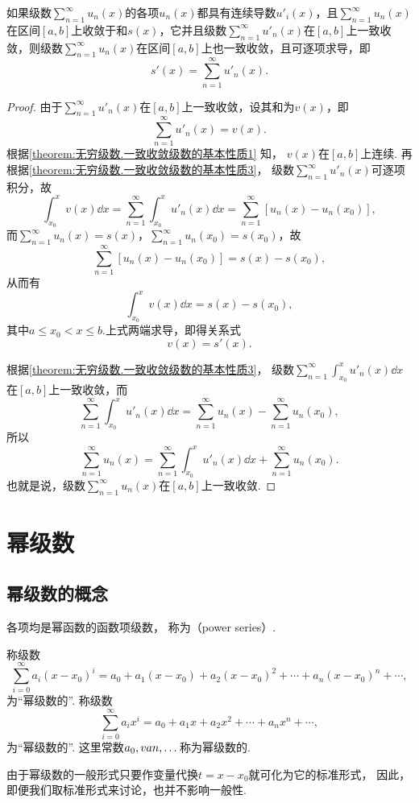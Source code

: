 \begin{property}\label{theorem:无穷级数.一致收敛级数的基本性质4}
\def\s{\sum\limits_{n=1}^\infty }
如果级数\(\s u_n(x)\)的各项\(u_n(x)\)都具有连续导数\(u'_i(x)\)，且\(\s u_n(x)\)在区间\([a,b]\)上收敛于和\(s(x)\)，它并且级数\(\s u'_n(x)\)在\([a,b]\)上一致收敛，则级数\(\s u_n(x)\)在区间\([a,b]\)上也一致收敛，且可逐项求导，即\[
s'(x) = \s u'_n(x).
\]
\begin{proof}
由于\(\s u'_n(x)\)在\([a,b]\)上一致收敛，设其和为\(v(x)\)，即\[
\s u'_n(x) = v(x).
\]
根据\cref{theorem:无穷级数.一致收敛级数的基本性质1} 知，%
\(v(x)\)在\([a,b]\)上连续.
再根据\cref{theorem:无穷级数.一致收敛级数的基本性质3}，%
级数\(\s u'_n(x)\)可逐项积分，故\[
\int_{x_0}^x v(x) \dd{x}
= \s \int_{x_0}^x u'_n(x) \dd{x}
= \s [u_n(x) - u_n(x_0)],
\]
而\(\s u_n(x) = s(x)\)，\(\s u_n(x_0) = s(x_0)\)，故\[
\s [u_n(x) - u_n(x_0)] = s(x) - s(x_0),
\]
从而有\[
\int_{x_0}^x v(x) \dd{x} = s(x) - s(x_0),
\]
其中\(a \leqslant x_0 < x \leqslant b\).上式两端求导，即得关系式\[
v(x) = s'(x).
\]

根据\cref{theorem:无穷级数.一致收敛级数的基本性质3}，%
级数\(\s \int_{x_0}^x u'_n(x) \dd{x}\)在\([a,b]\)上一致收敛，而\[
\s \int_{x_0}^x u'_n(x) \dd{x} = \s u_n(x) - \s u_n(x_0),
\]所以\[
\s u_n(x) = \s \int_{x_0}^x u'_n(x) \dd{x} + \s u_n(x_0).
\]也就是说，级数\(\s u_n(x)\)在\([a,b]\)上一致收敛.
\end{proof}
\end{property}

\section{幂级数}
\subsection{幂级数的概念}
\begin{definition}\label{definition:无穷级数.幂级数}
各项均是幂函数的函数项级数，%
称为（power series）.

称级数\[
\sum\limits_{i=0}^\infty a_i (x-x_0)^i
= a_0 + a_1 (x-x_0) + a_2 (x-x_0)^2 + \dotsb + a_n (x-x_0)^n + \dotsb,
\]为“幂级数的”.
称级数\[
\sum\limits_{i=0}^\infty a_i x^i
= a_0 + a_1 x + a_2 x^2 + \dotsb + a_n x^n + \dotsb,
\]为“幂级数的”.
这里常数\(a_0,v{a}{n},\dotsc\)称为幂级数的.
\end{definition}

由于幂级数的一般形式只要作变量代换\(t = x - x_0\)就可化为它的标准形式，%
因此，即便我们取标准形式来讨论，也并不影响一般性.

